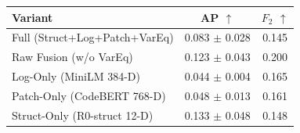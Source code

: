 \begin{center}\small\setlength{\tabcolsep}{5pt}
\begin{tabular}{lcc}
\toprule
Variant & AP $\uparrow$ & $F_2$ $\uparrow$ \\
\midrule
Full (Struct+Log+Patch+VarEq) & 0.083 $\pm$ 0.028 & 0.145 \\
Raw Fusion (w/o VarEq) & 0.123 $\pm$ 0.043 & 0.200 \\
Log-Only (MiniLM 384-D) & 0.044 $\pm$ 0.004 & 0.165 \\
Patch-Only (CodeBERT 768-D) & 0.048 $\pm$ 0.013 & 0.161 \\
Struct-Only (R0-struct 12-D) & 0.133 $\pm$ 0.048 & 0.148 \\
\bottomrule\end{tabular}
\end{center}
